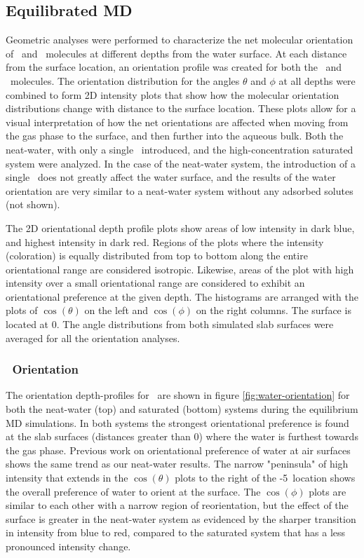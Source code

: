 \subsection{Equilibrated MD}

Geometric analyses were performed to characterize the net molecular orientation of \wat~and \suldiox~molecules at different depths from the water surface. At each distance from the surface location, an orientation profile was created for both the \wat~and \suldiox~molecules. The orientation distribution for the angles $\theta$ and $\phi$ at all depths were combined to form 2D intensity plots that show how the molecular orientation distributions change with distance to the surface location. These plots allow for a visual interpretation of how the net orientations are affected when moving from the gas phase to the surface, and then further into the aqueous bulk. Both the neat-water, with only a single \suldiox~introduced, and the high-concentration saturated system were analyzed. In the case of the neat-water system, the introduction of a single \suldiox~does not greatly affect the water surface, and the results of the water orientation are very similar to a neat-water system without any adsorbed solutes (not shown).

The 2D orientational depth profile plots show areas of low intensity in dark blue, and highest intensity in dark red. Regions of the plots where the intensity (coloration) is equally distributed from top to bottom along the entire orientational range are considered isotropic. Likewise, areas of the plot with high intensity over a small orientational range are considered to exhibit an orientational preference at the given depth.  The histograms are arranged with the plots of $\cos(\theta)$ on the left and $\cos(\phi)$ on the right columns. The surface is located at 0\angs. The angle distributions from both simulated slab surfaces were averaged for all the orientation analyses.

\subsubsection{\wat~Orientation}

The orientation depth-profiles for \wat~are shown in figure \ref{fig:water-orientation} for both the neat-water (top) and saturated (bottom) systems during the equilibrium MD simulations. In both systems the strongest orientational preference is found at the slab surfaces (distances greater than 0\angs) where the water is furthest towards the gas phase. Previous work on orientational preference of water at air surfaces shows the same trend as our neat-water results.\cite{Walker2006b,Hore2008} The narrow "peninsula" of high intensity that extends in the $\cos(\theta)$ plots to the right of the -5\angs~location shows the overall preference of water to orient at the surface. The $\cos(\phi)$ plots are similar to each other with a narrow region of reorientation, but the effect of the surface is greater in the neat-water system as evidenced by the sharper transition in intensity from blue to red, compared to the saturated system that has a less pronounced intensity change.

